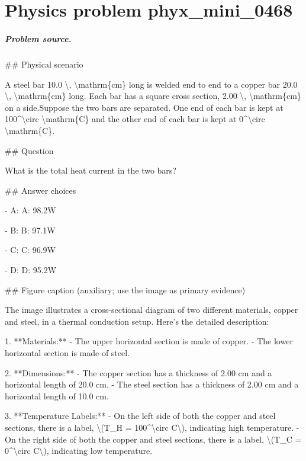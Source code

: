 
\chapter{Physics problem phyx\_mini\_0468}
\label{ch:PhyXMiniProblems_problem_phyx_mini_0468}

\paragraph{Problem source.}
\#\# Physical scenario

A steel bar 10.0 \textbackslash{}, \textbackslash{}mathrm\{cm\} long is welded end to end to a copper bar 20.0 \textbackslash{}, \textbackslash{}mathrm\{cm\} long. Each bar has a square cross section, 2.00 \textbackslash{}, \textbackslash{}mathrm\{cm\} on a side.Suppose the two bars are separated. One end of each bar is kept at 100\textasciicircum{}\textbackslash{}circ \textbackslash{}mathrm\{C\} and the other end of each bar is kept at 0\textasciicircum{}\textbackslash{}circ \textbackslash{}mathrm\{C\}.

\#\# Question

What is the total heat current in the two bars?

\#\# Answer choices

- A: A: 98.2W

- B: B: 97.1W

- C: C: 96.9W

- D: D: 95.2W

\#\# Figure caption (auxiliary; use the image as primary evidence)

The image illustrates a cross-sectional diagram of two different materials, copper and steel, in a thermal conduction setup. Here's the detailed description:

1. **Materials:**
   - The upper horizontal section is made of copper.
   - The lower horizontal section is made of steel.

2. **Dimensions:**
   - The copper section has a thickness of 2.00 cm and a horizontal length of 20.0 cm.
   - The steel section has a thickness of 2.00 cm and a horizontal length of 10.0 cm.

3. **Temperature Labels:**
   - On the left side of both the copper and steel sections, there is a label, \textbackslash{}(T\_H = 100\textasciicircum{}\textbackslash{}circ C\textbackslash{}), indicating high temperature.
   - On the right side of both the copper and steel sections, there is a label, \textbackslash{}(T\_C = 0\textasciicircum{}\textbackslash{}circ C\textbackslash{}), indicating low temperature.

